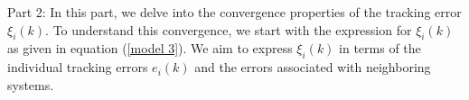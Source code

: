 \documentclass[journal,onecolumn]{IEEEtran}
\begin{document}

















Part 2: In this part, we delve into the convergence properties of the tracking error \(\xi_i(k)\). To understand this convergence, we start with the expression for \(\xi_i(k)\) as given in equation (\ref{model 3}). We aim to express \(\xi_i(k)\) in terms of the individual tracking errors \(e_i(k)\) and the errors associated with neighboring systems.
\end{document}
